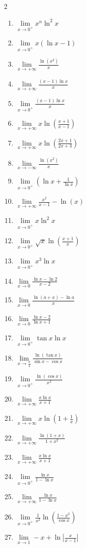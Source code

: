 \documentclass[12pt,a4paper]{article}
\begin{document}
\begin{multicols}{2}
\begin{enumerate}
\item $ \lim\limits_{x \to 0^+} x^n \ln^2 x $
\item $ \lim\limits_{x \to 0^+} x (\ln x - 1) $ 
\item $ \lim\limits_{x \to +\infty} \frac{\ln(x^2)}{x} $
\item $ \lim\limits_{x \to +\infty} \frac{(x - 1) \ln x}{x} $
\item $ \lim\limits_{x \to 0^+} \frac{(x - 1) \ln x}{x} $

\item $ \lim\limits_{x \to +\infty} x \ln\left(\frac{x+1}{x-1}\right) $ 
\item $ \lim\limits_{x \to +\infty} x \ln\left(\frac{2x+1}{2x+3}\right) $ 
\item $ \lim\limits_{x \to -\infty} \frac{\ln(x^2)}{x} $
\item $ \lim\limits_{x \to 0^+} \left(\ln x + \frac{1}{\ln x}\right) $


\item $ \lim\limits_{x \to +\infty} \frac{x^2}{x-1} - \ln(x) $ 
\item $ \lim\limits_{x \to 0^+} x \ln^2 x $ 
\item $ \lim\limits_{x \to 0^+} \sqrt{x} \ln\left(\frac{x+1}{x}\right) $ 
\item $ \lim\limits_{x \to 0^+} x^3 \ln x $


\item $ \lim\limits_{x \to 0} \frac{\ln x - \ln 2}{x-2} $
\item $ \lim\limits_{x \to 0} \frac{\ln(a+x) - \ln a}{x} $
\item $ \lim\limits_{x \to 0} \frac{\ln x - 2}{\ln x + 1} $ 
\item $ \lim\limits_{x \to 0^+} \tan x \ln x $ 
\item $ \lim\limits_{x \to \frac{\pi}{4}} \frac{\ln(\tan x)}{\sin x - \cos x} $

\item $ \lim\limits_{x \to 0^+} \frac{\ln(\cos x)}{x^2} $
\item $ \lim\limits_{x \to +\infty} \frac{x \ln x}{x+1} $ 
\item $ \lim\limits_{x \to +\infty} x \ln\left(1 + \frac{1}{x}\right) $ 
\item $ \lim\limits_{x \to +\infty} \frac{\ln(1+x)}{1+x^2} $
\item $ \lim\limits_{x \to +\infty} \frac{x \ln x}{x+1} $

\item $ \lim\limits_{x \to 0^+} \frac{\ln x}{1 - \ln x} $
\item $ \lim\limits_{x \to +\infty} \frac{\ln x}{1 - \ln x} $ 
\item $ \lim\limits_{x \to 0^+} \frac{1}{x^2}\ln\left(\frac{1 - x^2}{\cos x}\right) $
\item $ \lim\limits_{x \to 1} -x + \ln\left|\frac{x}{x-1}\right| $


\end{enumerate}
\end{multicols}
\end{document}
